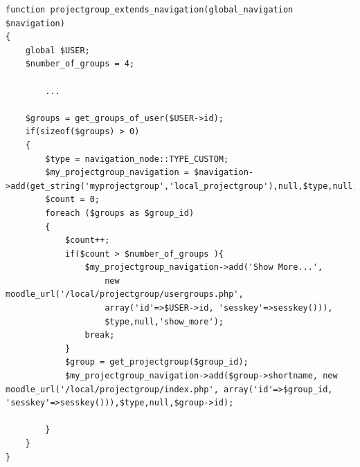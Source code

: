 \begin{lstlisting}[style=phpCode, caption=\myCaption{The code for extending the navigation block}, label=src:moodlecodeextendingnavigation]
function projectgroup_extends_navigation(global_navigation $navigation) 
{
	global $USER;
	$number_of_groups = 4;
	
		...
	
	$groups = get_groups_of_user($USER->id);
	if(sizeof($groups) > 0)
	{
		$type = navigation_node::TYPE_CUSTOM;
		$my_projectgroup_navigation = $navigation->add(get_string('myprojectgroup','local_projectgroup'),null,$type,null,'myprojectgroup');
		$count = 0;
		foreach ($groups as $group_id) 
		{
			$count++;
			if($count > $number_of_groups ){
				$my_projectgroup_navigation->add('Show More...', 
					new moodle_url('/local/projectgroup/usergroups.php',
					array('id'=>$USER->id, 'sesskey'=>sesskey())),
					$type,null,'show_more');
				break;
			}
			$group = get_projectgroup($group_id);
			$my_projectgroup_navigation->add($group->shortname, new moodle_url('/local/projectgroup/index.php', array('id'=>$group_id, 'sesskey'=>sesskey())),$type,null,$group->id);
			
		}
	}
}
\end{lstlisting}












